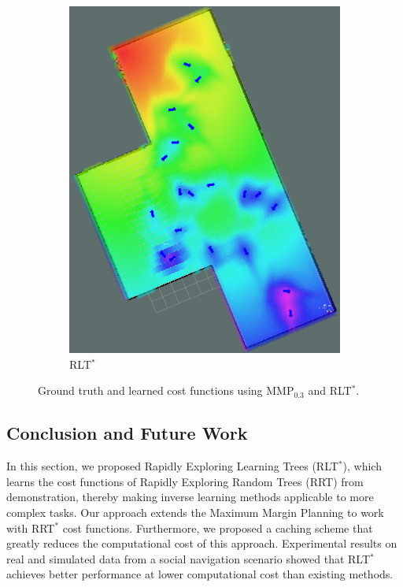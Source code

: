 \documentclass[a4paper,11pt]{report}
\begin{document}
\begin{figure}[tbh]
\begin{subfigure}[b]{0.305\columnwidth}
    \includegraphics[width=1.\textwidth]{figures/rrt_cf.png}
    \caption{RLT$^*$}
    \label{fig:rrt_cf}
  \end{subfigure} 
  	  \caption{Ground truth and learned cost functions using MMP$_{0.3}$ and RLT$^*$.  \label{fig:cfs}}
  \end{figure}


\subsection{Conclusion and Future Work}
In this section, we proposed Rapidly Exploring Learning Trees (RLT$^*$), which learns the cost functions of Rapidly Exploring Random Trees (RRT) from demonstration, thereby making inverse learning methods applicable to more complex tasks. Our approach extends the Maximum Margin Planning to work with RRT$^*$ cost functions. Furthermore, we proposed a caching scheme that greatly reduces the computational cost of this approach. Experimental results on real and simulated data from a social navigation scenario showed that RLT$^*$ achieves better performance at lower computational cost than existing methods.
\end{document}
